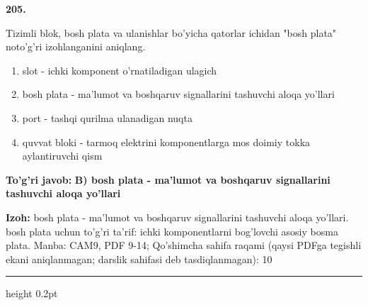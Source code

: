 \documentclass[10pt,a4paper]{article}
\begin{document}
{\bfseries\sffamily\color{ink} 205.}
\par
Tizimli blok, bosh plata va ulanishlar bo'yicha qatorlar ichidan "bosh plata" noto'g'ri izohlanganini aniqlang.
\begin{enumerate}[label=\Alph*),leftmargin=9mm]
\item slot - ichki komponent o'rnatiladigan ulagich
\item bosh plata - ma'lumot va boshqaruv signallarini tashuvchi aloqa yo'llari
\item port - tashqi qurilma ulanadigan nuqta
\item quvvat bloki - tarmoq elektrini komponentlarga mos doimiy tokka aylantiruvchi qism
\end{enumerate}
\begin{tcolorbox}[enhanced,breakable,colback=teal!4,colframe=teal!60!black,boxrule=0.45pt,arc=1.2mm,left=2.7mm,right=2.7mm,top=1.8mm,bottom=1.8mm,before skip=2mm,after skip=2mm]
{\bfseries\sffamily\color{teal}To'g'ri javob:} \textbf{B) bosh plata - ma'lumot va boshqaruv signallarini tashuvchi aloqa yo'llari}
\par\smallskip
{\bfseries Izoh:} bosh plata - ma'lumot va boshqaruv signallarini tashuvchi aloqa yo'llari. bosh plata uchun to'g'ri ta'rif: ichki komponentlarni bog'lovchi asosiy bosma plata. Manba: CAM9, PDF 9-14; Qo'shimcha sahifa raqami (qaysi PDFga tegishli ekani aniqlanmagan; darslik sahifasi deb tasdiqlanmagan): 10
\end{tcolorbox}
\vspace{2mm}\hrule height 0.2pt\vspace{3mm}
\end{document}
